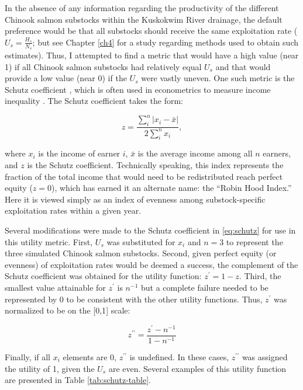 \documentclass[12pt,]{book}
\theoremstyle{definition}
\theoremstyle{definition}
\theoremstyle{definition}
\theoremstyle{remark}
\begin{document}
\noindent
In the absence of any information regarding the productivity of the
different Chinook salmon substocks within the Kuskokwim River drainage,
the default preference would be that all substocks should receive the
same exploitation rate (\(U_s = \frac{H_s}{N_s}\); but see Chapter
\ref{ch4} for a study regarding methods used to obtain such estimates).
Thus, I attempted to find a metric that would have a high value (near 1)
if all Chinook salmon substocks had relatively equal \(U_s\) and that
would provide a low value (near 0) if the \(U_s\) were vastly uneven.
One such metric is the Schutz coefficient
\citep{schutz-1951, habib-2012}, which is often used in econometrics to
measure income inequality \citep[e.g.,][]{kennedy-etal-1996}. The Schutz
coefficient takes the form:

\begin{equation}
  z = \frac{\sum_i^n|x_i-\bar{x}|}{2\sum_i^nx_i},
  \label{eq:schutz}
\end{equation}

\noindent
where \(x_i\) is the income of earner \(i\), \(\bar{x}\) is the average
income among all \(n\) earners, and \(z\) is the Schutz coefficient.
Technically speaking, this index represents the fraction of the total
income that would need to be redistributed reach perfect equity
(\(z = 0\)), which has earned it an alternate name: the ``Robin Hood
Index.'' Here it is viewed simply as an index of evenness among
substock-specific exploitation rates within a given year.

Several modifications were made to the Schutz coefficient in
\eqref{eq:schutz} for use in this utility metric. First, \(U_s\) was
substituted for \(x_i\) and \(n=3\) to represent the three simulated
Chinook salmon substocks. Second, given perfect equity (or evenness) of
exploitation rates would be deemed a success, the complement of the
Schutz coefficient was obtained for the utility function:
\(z^\prime = 1 - z\). Third, the smallest value attainable for
\(z^\prime\) is \(n^{-1}\) but a complete failure needed to be
represented by 0 to be consistent with the other utility functions.
Thus, \(z^\prime\) was normalized to be on the {[}0,1{]} scale:

\begin{equation}
  z^{\prime\prime} = \frac{z^\prime-n^{-1}}{1 - n^{-1}}
  \label{eq:mod-schutz}
\end{equation}

\noindent
Finally, if all \(x_i\) elements are 0, \(z^{\prime\prime}\) is
undefined. In these cases, \(z^{\prime\prime}\) was assigned the utility
of 1, given the \(U_s\) are even. Several examples of this utility
function are presented in Table \ref{tab:schutz-table}.
\end{document}
